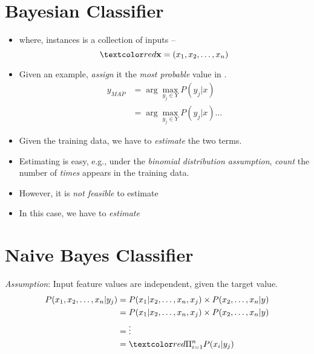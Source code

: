 \documentclass[
	title={Na\:ive Bayes Learning}
]{cs584notes}
\begin{document}
\section{Bayesian Classifier}\label{sec:bayesian-classifier}
\begin{itemize}
	\item {} where, instances  is a collection of inputs --
	\[ \data{ \vec{x} = (x_{1}, x_{2}, \dots, x_{n}) } \]
	\item Given an example, \emph{assign} it the \emph{most probable} value in .
	\begin{equation*}
	\begin{aligned}
		y_{MAP} &= \arg\max_{y_{j}\in Y} P(y_{j} | x)\\
				&= \arg\max_{y_{j}\in Y} P(y_{j} | x) \dots
	\end{aligned}
	\end{equation*}
	\item Given the training data, we have to \emph{estimate} the two terms.
	\item Estimating  is easy, e.g., under the \emph{binomial distribution assumption}, \emph{count} the number of \emph{times}  appears in the training data.
	\item However, it is \emph{not feasible} to estimate 
	\item In this case, we have to \emph{estimate}
\end{itemize}

\section{Na\:ive Bayes Classifier}\label{sec:naive-bayes-classifier}
\emph{Assumption}: Input feature values are independent, given the target value.
\begin{equation*}
\begin{aligned}
	P(x_{1}, x_{2}, \dots, x_{n} | y_{j}) &= P(x_{1} | x_{2}, \dots, x_{n}, x_{j}) \times P(x_{2}, \dots, x_{n} | y)\\
										  &= P(x_{1} | x_{2}, \dots, x_{n}, x_{j}) \times P(x_{2}, \dots, x_{n} | y)\\
	&=\vdots\\
	&= \data{ \Pi_{i=1}^{n} P(x_{i} | y_{j}) }
\end{aligned}
\end{equation*}
\end{document}
